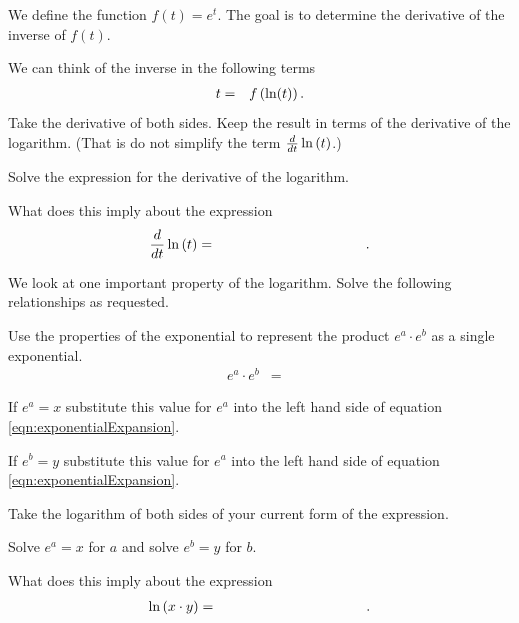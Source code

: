 \begin{problem}

\item We define the function $f(t)=e^t$. The goal is to determine the
  derivative of the inverse of $f(t)$.
  \begin{subproblem}
  \item We can think of the inverse in the following terms
    \begin{eqnarray*}
      t & = & f\left(\ln (t) \right).
    \end{eqnarray*}
    Take the derivative of both sides.  Keep the result in terms of the derivative of the
    logarithm.  (That is do not simplify the term
    $\frac{d}{dt} \ln\left( t \right)$.)
    \vfill
  \item Solve the expression for the derivative of the logarithm.
    \vfill
    \item What does this imply about the expression
    \begin{eqnarray*}
      \frac{d}{dt} \ln\lp t \rp & = & \hspace{10em}.
    \end{eqnarray*}
  \end{subproblem}

\clearpage

\item We look at one important property of the logarithm. Solve the
  following relationships as requested.
  \begin{subproblem}
  \item Use the properties of the exponential to represent the product
    $e^a\cdot e^b$ as a single exponential.
    \label{subprob:exponentialExpansion}
    \begin{eqnarray}
      \label{eqn:exponentialExpansion}
      e^a \cdot e^b & = & 
    \end{eqnarray}
  \item If $e^a=x$ substitute this value for $e^a$ into the left hand
    side of equation \ref{eqn:exponentialExpansion}.
    \vspace{4em}
  \item If $e^b=y$ substitute this value for $e^a$ into the left hand
    side of equation \ref{eqn:exponentialExpansion}.
    \vspace{4em}
  \item Take the logarithm of both sides of your current form of the expression.
    \vfill
  \item Solve $e^a=x$ for $a$ and solve $e^b=y$ for $b$.
    \vfill
  \item What does this imply about the expression 
    \begin{eqnarray*}
      \ln\lp x \cdot y \rp & = & \hspace{10em}.
    \end{eqnarray*}
  \end{subproblem}


\end{problem}
